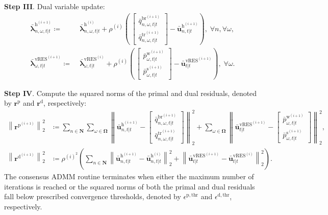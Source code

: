\documentclass[a4paper,fleqn]{cas-sc}
\begin{document}
\textbf{Step III}. Dual variable update:
\begin{align}
\boldsymbol{\bar{\lambda}}^{\boldsymbol{\mathrm{h}}^{(i+1)}}_{n,\omega,t|t}
\coloneqq
& \; \boldsymbol{\bar{\lambda}}^{\boldsymbol{\mathrm{h}}^{(i)}}_{n,\omega,t|t}
+ \rho^{(i)}
\left( \,
\begin{bmatrix}
\bar{q}^{{\mathrm{br}}^{(i+1)}}_{n,\omega,t|t} \\[0.4em]
\bar{q}^{{\mathrm{tr}}^{(i+1)}}_{n,\omega,t|t}
\end{bmatrix}
- \boldsymbol{\bar{u}}^{\boldsymbol{\mathrm{h}}^{(i+1)}}_{n,t|t}
\right),
\; \forall n, \forall \omega,
\label{ADMM_step3_1}\\
\boldsymbol{\bar{\lambda}}^{\boldsymbol{\mathrm{vRES}}^{(i+1)}}_{\omega,t|t}
\coloneqq
& \; \boldsymbol{\bar{\lambda}}^{\boldsymbol{\mathrm{vRES}}^{(i)}}_{\omega,t|t}
+ \rho^{(i)}
\left( \,
\begin{bmatrix}
\bar{p}^{{\mathrm{w}}^{(i+1)}}_{\omega,t|t} \\[0.4em]
\bar{p}^{{\mathrm{s}}^{(i+1)}}_{\omega,t|t}
\end{bmatrix}
- \boldsymbol{\bar{u}}^{\boldsymbol{\mathrm{vRES}}^{(i+1)}}_{t|t}
\right),
\; \forall \omega.
\label{ADMM_step3_2}
\end{align}

\textbf{Step IV}. Compute the squared norms of the primal and dual residuals, denoted by $\boldsymbol{r^{\mathrm{p}}}$ and $\boldsymbol{r^{\mathrm{d}}}$, respectively:
\begin{align}
\left\|\boldsymbol{r}^{\boldsymbol{\mathrm{p}}^{(i+1)}}\right\|_2^2 & \coloneqq
\sum_{n \in \boldsymbol{N}} \sum_{\omega \in \boldsymbol{\Omega}}
\left\|
\boldsymbol{\bar{u}}^{\boldsymbol{\mathrm{h}}^{(i+1)}}_{n,t|t} - \begin{bmatrix}
\bar{q}^{{\mathrm{br}}^{(i+1)}}_{n,\omega,t|t}\\[0.4em]
\bar{q}^{{\mathrm{tr}}^{(i+1)}}_{n,\omega,t|t}
\end{bmatrix}
\right\|_2^2
+ \sum_{\omega \in \boldsymbol{\Omega}}
\left\|
\boldsymbol{\bar{u}}^{\boldsymbol{\mathrm{vRES}}^{(i+1)}}_{t|t} - \begin{bmatrix}
\bar{p}^{\mathrm{w}^{(i+1)}}_{\omega,t|t} \\[0.4em]
\bar{p}^{\mathrm{s}^{(i+1)}}_{\omega,t|t}
\end{bmatrix}
\right\|_2^2,
\label{ADMM_step4_1}\\
\left\|\boldsymbol{r}^{\boldsymbol{\mathrm{d}}^{(i+1)}}\right\|_2^2 & \coloneqq
\rho^{{(i)}^2}
\left(
\sum_{n \in \boldsymbol{N}}
\left\|
\boldsymbol{\bar{u}}^{\boldsymbol{\mathrm{h}}^{(i+1)}}_{n,t|t} - \boldsymbol{\bar{u}}^{\boldsymbol{\mathrm{h}}^{(i)}}_{n,t|t}
\right\|_2^2
+ \left\|
\boldsymbol{\bar{u}}^{\boldsymbol{\mathrm{vRES}}^{(i+1)}}_{t|t} - \boldsymbol{\bar{u}}^{\boldsymbol{\mathrm{vRES}}^{(i)}}_{t|t}
\right\|_2^2
\right).
\label{ADMM_step4_2}
\end{align}
The consensus ADMM routine terminates when either the maximum number of iterations is reached or the squared norms of both the primal and dual residuals fall below prescribed convergence thresholds,
denoted by $\epsilon^{\mathrm{p,thr}}$ and $\epsilon^{\mathrm{d,thr}}$, respectively.
\end{document}
